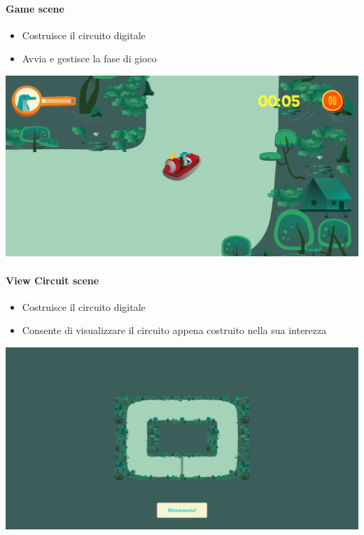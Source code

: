 \documentclass[documentation.tex]{subfiles}
\begin{document}
		\paragraph{Game scene}
			\begin{itemize}
				\item Costruisce il circuito digitale
				\item Avvia e gestisce la fase di gioco
			\end{itemize}
			\includegraphics[width=\textwidth]{./images/game.png}
		\paragraph{View Circuit scene}
			\begin{itemize}
				\item Costruisce il circuito digitale
				\item Consente di visualizzare il circuito appena costruito nella sua interezza
			\end{itemize}
			\includegraphics[width=\textwidth]{./images/view.png}
\end{document}

